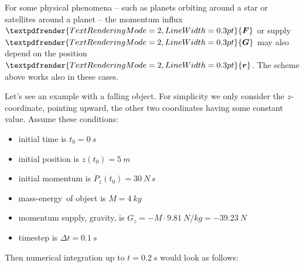\documentclass[a4paper,12pt,%
onecolumn,oneside,titlepage,%
british%
]{memoir}
\renewcommand*{\bm}[1]{\textpdfrender{TextRenderingMode=2,LineWidth=0.3pt}{\boldsymbol{#1}}}
\newcommand*{\incr}{\Delta}%
\renewcommand*{\|}[1][]{\nonscript\:#1\vert\nonscript\:\mathopen{}}
\newcommand*{\yr}{\bm{r}}
\newcommand*{\yM}{M}%
\newcommand*{\yF}{\bm{F}}
\newcommand*{\yG}{\bm{G}}
\newcommand*{\Dt}{\incr t}
\newcommand*{\masse}{mass-energy}
\begin{document}
For some physical phenomena -- such as planets orbiting around a star or satellites around a planet -- the momentum influx $\yF$ or supply $\yG$ may also depend on the position $\yr$. The scheme above works also in these cases.

Let's see an example with a falling object. For simplicity we only consider the $z$-coordinate, pointing upward, the other two coordinates having some constant value. Assume these conditions:
\begin{itemize}\tightlist
\item initial time is $t_{0}=\qty{0}{s}$
\item initial position is $z(t_{0})=\qty{5}{m}$
\item initial momentum is $P_{z}(t_{0})=\qty{30}{N\,s}$
\item \masse\ of object is $\yM=\qty{4}{kg}$
\item momentum supply, gravity, is $G_{z}=-\yM\cdot\qty{9.81}{N/kg} = \qty{-39.23}{N}$
\item timestep is $\Dt = \qty{0.1}{s}$
\end{itemize}
Then numerical integration up to $t=\qty{0.2}{s}$ would look as follows:\noprelistbreak
\end{document}

